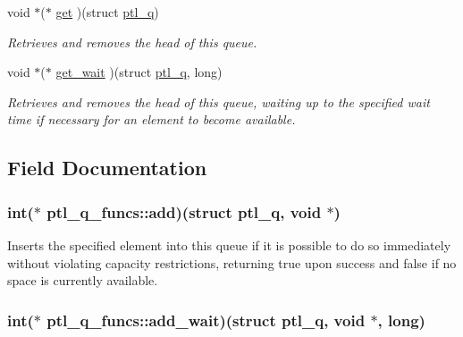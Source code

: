 \begin{CompactItemize}
void $\ast$($\ast$ \hyperlink{structptl__q__funcs_d321c7f9c2972b4791fd827dca5f04c8}{get} )(struct \hyperlink{structptl__q}{ptl\_\-q})
\begin{CompactList}\small\item\em Retrieves and removes the head of this queue. \item\end{CompactList}\item 
void $\ast$($\ast$ \hyperlink{structptl__q__funcs_a580c7543fb38eaffee9c40c470da528}{get\_\-wait} )(struct \hyperlink{structptl__q}{ptl\_\-q}, long)
\begin{CompactList}\small\item\em Retrieves and removes the head of this queue, waiting up to the specified wait time if necessary for an element to become available. \item\end{CompactList}\end{CompactItemize}


\subsection{Field Documentation}
\hypertarget{structptl__q__funcs_7a825aba959301d3d51e1b397e4b4569}{
\subsubsection{\setlength{\rightskip}{0pt plus 5cm}int($\ast$ {\bf ptl\_\-q\_\-funcs::add})(struct {\bf ptl\_\-q}, void $\ast$)}}
\label{structptl__q__funcs_7a825aba959301d3d51e1b397e4b4569}


Inserts the specified element into this queue if it is possible to do so immediately without violating capacity restrictions, returning true upon success and false if no space is currently available. 

\hypertarget{structptl__q__funcs_9b5b84b8bfd46f1c284339c6a33be29e}{
\subsubsection{\setlength{\rightskip}{0pt plus 5cm}int($\ast$ {\bf ptl\_\-q\_\-funcs::add\_\-wait})(struct {\bf ptl\_\-q}, void $\ast$, long)}}
\label{structptl__q__funcs_9b5b84b8bfd46f1c284339c6a33be29e}


